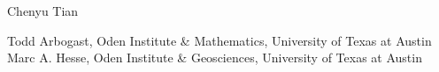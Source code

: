 \documentclass[usenames,dvipsnames,letterpaper,landscape,final]{slides}
\def\grad{\nabla}
\renewcommand\div{\nabla\cdot}
\def\grad{\nabla}
\def\div{\nabla\cdot}
\def\v{\mathbf{v}}
\def\bsigma{\pmb{\sigma}}
\begin{document}
\begin{myslide}
\headingline
		  \vspace*{-30pt}{\bf\Large\begin{center}
					 Simulation of Multiphase Flow and Transport in Partially Melted Materials
		  \end{center}}

\vfill

\begin{center}{\obeylines
Chenyu Tian
\bigskip
		  {\it{} 
		  }
}
\end{center}

\vfill

		  \begin{center}
					 Todd Arbogast, Oden Institute \& Mathematics, University of Texas at Austin\\
Marc A. Hesse, Oden Institute \& Geosciences, University of Texas at Austin\\
		  \end{center}

		  \vspace*{10pt}

\end{myslide}
%
\end{document}
